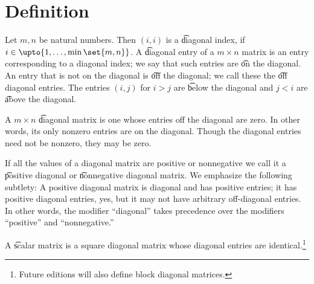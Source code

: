 
\section*{Definition}

Let $m, n$ be natural numbers.
Then $(i, i)$ is a \t{diagonal index}, if $i \in \upto{1, \dots , \min\set{m, n}}$.
A \t{diagonal entry} of a $m \times n$ matrix is an entry corresponding to a diagonal index; we say that such entries are \t{on the diagonal}.
An entry that is not on the diagonal is \t{off the diagonal}; we call these the \t{off diagonal entries}.
The entries $(i, j)$ for $i > j$ are \t{below the diagonal} and $j < i$ are \t{above the diagonal}.

A $m \times n$ \t{diagonal} matrix is one whose entries off the diagonal are zero.
In other words, its only nonzero entries are on the diagonal.
Though the diagonal entries need not be nonzero, they may be zero.

If all the values of a diagonal matrix are positive or nonnegative we call it a \t{positive diagonal} or \t{nonnegative diagonal} matrix.
We emphasize the following subtlety: A positive diagonal matrix is diagonal and has positive entries; it has positive diagonal entries, yes, but it may not have arbitrary off-diagonal entries.
In other words, the modifier ``diagonal'' takes precedence over the modifiers ``positive'' and ``nonnegative.''

A \t{scalar matrix} is a square diagonal matrix whose diagonal entries are identical.\footnote{Future editions will also define block diagonal matrices.}

\blankpage